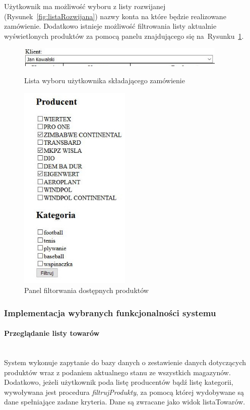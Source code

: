 \documentclass[a4paper, 12pt]{article}
\begin{document}
Użytkownik ma możliwość wyboru z listy rozwijanej (Rysunek~\ref{fig:listaRozwijana}) nazwy konta na które będzie realizowane zamówienie. Dodatkowo istnieje możliwość filtrowania listy aktualnie wyświetlonych produktów za pomocą panelu znajdującego się na~Rysunku~\ref{fig:panelFiltrowaniaProduktów}.

\begin{figure}[H]
	\centering
	\includegraphics[width=10cm]{Screeny/listaRozwijana.JPG}
	\caption[Lista wyboru użytkownika]{Lista wyboru użytkownika składającego zamówienie}
	\label{fig:listaRozwijana}
	
	\centering
	\includegraphics[height=10cm]{Screeny/panelFiltrowania.JPG}
	\caption[Panel filtorwania dostępnych produktów]{Panel filtorwania dostępnych produktów}
	\label{fig:panelFiltrowaniaProduktów}
\end{figure}

\subsubsection{Implementacja wybranych funkcjonalności systemu}
\paragraph{Przeglądanie listy towarów} \mbox{}\\
System wykonuje zapytanie do bazy danych o zestawienie danych dotyczących produktów wraz z podaniem aktualnego stanu ze wszystkich magazynów. Dodatkowo, jeżeli użytkownik poda listę producentów bądź listę kategorii, wywoływana jest procedura \textit{filtrujProdukty}, za pomocą której wydobywane są dane spełniające zadane kryteria. Dane są zwracane jako widok listaTowarów.
\end{document}

